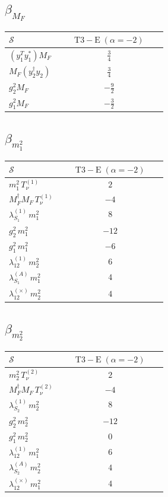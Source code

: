 \documentclass[9pt]{article}
\begin{document}
\subsection*{$ \beta_{M_F} $}
\begin{longtable}{@{}p{0.31\linewidth}c@{}}
\toprule
$\mathcal{S}$ & $ \mathrm{T3-E}\;(\alpha=-2) $ \\
\midrule
$ (y_1^T y_1^*)M_F $ & $ \frac{3}{4} $ \\
$ M_F(y_2^\dagger y_2) $ & $ \frac{3}{4} $ \\
$ g_2^2M_F $ & $ - \frac{9}{2} $ \\
$ g_1^2M_F $ & $ - \frac{3}{2} $ \\
\bottomrule
\end{longtable}
\subsection*{$ \beta_{m_1^{2}} $}
\begin{longtable}{@{}p{0.31\linewidth}c@{}}
\toprule
$\mathcal{S}$ & $ \mathrm{T3-E}\;(\alpha=-2) $ \\
\midrule
$ m_1^{2}\,T_{\nu}^{(1)} $ & $ 2 $ \\
$ M_F^\dagger M_F\,T_{\nu}^{(1)} $ & $ -4 $ \\
$ \lambda_{S_1}^{(1)}\,m_1^{2} $ & $ 8 $ \\
$ g_2^2\,m_1^{2} $ & $ -12 $ \\
$ g_1^2\,m_1^{2} $ & $ -6 $ \\
$ \lambda_{12}^{(1)}\,m_2^{2} $ & $ 6 $ \\
$ \lambda_{S_1}^{(A)}\,m_1^{2} $ & $ 4 $ \\
$ \lambda_{12}^{(\times)}\,m_2^{2} $ & $ 4 $ \\
\bottomrule
\end{longtable}
\subsection*{$ \beta_{m_2^{2}} $}
\begin{longtable}{@{}p{0.31\linewidth}c@{}}
\toprule
$\mathcal{S}$ & $ \mathrm{T3-E}\;(\alpha=-2) $ \\
\midrule
$ m_2^{2}\,T_{\nu}^{(2)} $ & $ 2 $ \\
$ M_F^\dagger M_F\,T_{\nu}^{(2)} $ & $ -4 $ \\
$ \lambda_{S_2}^{(1)}\,m_2^{2} $ & $ 8 $ \\
$ g_2^2\,m_2^{2} $ & $ -12 $ \\
$ g_1^2\,m_2^{2} $ & $ 0 $ \\
$ \lambda_{12}^{(1)}\,m_1^{2} $ & $ 6 $ \\
$ \lambda_{S_2}^{(A)}\,m_2^{2} $ & $ 4 $ \\
$ \lambda_{12}^{(\times)}\,m_1^{2} $ & $ 4 $ \\
\bottomrule
\end{longtable}
\end{document}
